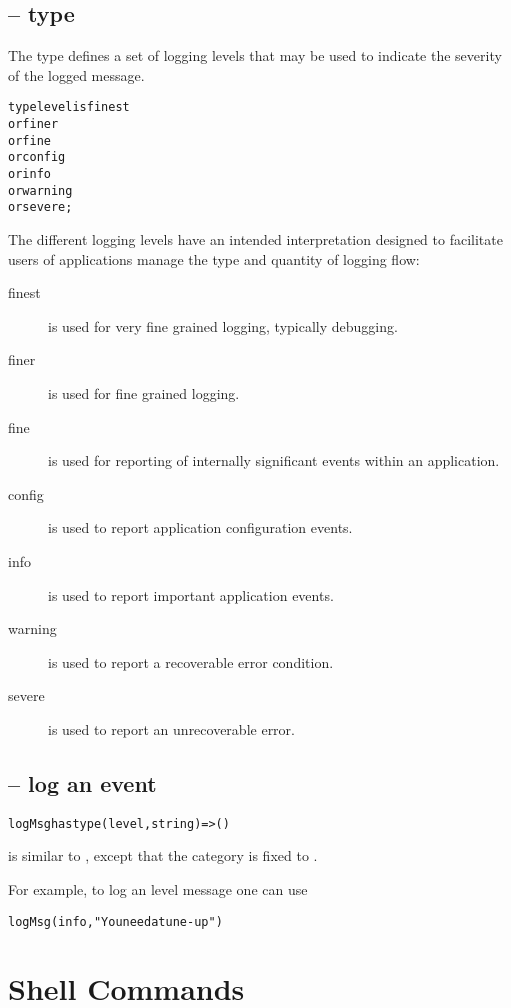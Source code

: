 \subsection{ -- type}
\label{levelType}

The  type defines a set of logging levels that may be used to indicate the severity of the logged message.
\begin{alltt}
type level is finest
  or finer
  or fine
  or config
  or info
  or warning
  or severe;
\end{alltt}

The different logging levels have an intended interpretation designed to facilitate users of applications manage the type and quantity of logging flow:
\begin{description}
\item[finest] is used for very fine grained logging, typically debugging.
\item[finer] is used for fine grained logging.
\item[fine] is used for reporting of internally significant events within an application.
\item[config] is used to report application configuration events.
\item[info] is used to report important application events.
\item[warning] is used to report a recoverable error condition.
\item[severe] is used to report an unrecoverable error.
\end{description}

\subsection{ -- log an event}
\label{logMsg}
\begin{alltt}
logMsg has type (level,string)=>()
\end{alltt}

 is similar to , except that the category is fixed to .

For example, to log an  level message one can use
\begin{alltt}
logMsg(info,"You need a tune-up")
\end{alltt}

\section{Shell Commands}
\label{shellCommand}

